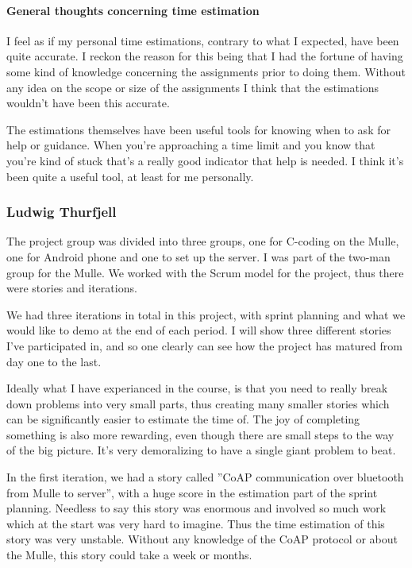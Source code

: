 \paragraph{General thoughts concerning time estimation}

I feel as if my personal time estimations, contrary to what I expected, have been quite accurate. I reckon the reason for this being that I had the fortune of having some kind of knowledge concerning the assignments prior to doing them. Without any idea on the scope or size of the assignments I think that the estimations wouldn't have been this accurate.

The estimations themselves have been useful tools for knowing when to ask for help or guidance. When you're approaching a time limit and you know that you're kind of stuck that's a really good indicator that help is needed. I think it's been quite a useful tool, at least for me personally.

\subsubsection{Ludwig Thurfjell}
The project group was divided into three groups, one for C-coding on the Mulle, one for Android phone
and one to set up the server. I was part of the two-man group for the Mulle. We worked with the Scrum model 
for the project, thus there were stories and iterations. 

We had three iterations in total in this project, with sprint planning and what we would like to demo at the 
end of each period. I will show three different stories I've participated in, and so one clearly can see
how the project has matured from day one to the last.

Ideally what I have experianced in the course, is that you need to really break down problems into very small
parts, thus creating many smaller stories which can be significantly easier to estimate the time of. The joy of completing
something is also more rewarding, even though there are small steps to the way of the big picture. It's very demoralizing to 
have a single giant problem to beat.

In the first iteration, we had a story called ''CoAP communication over bluetooth from Mulle to server'', with a huge score
in the estimation part of the sprint planning. Needless to say this story was enormous and involved so much work which at the start
was very hard to imagine. Thus the time estimation of this story was very unstable. Without any knowledge of the CoAP protocol or about the Mulle, this story could take a week or months.

